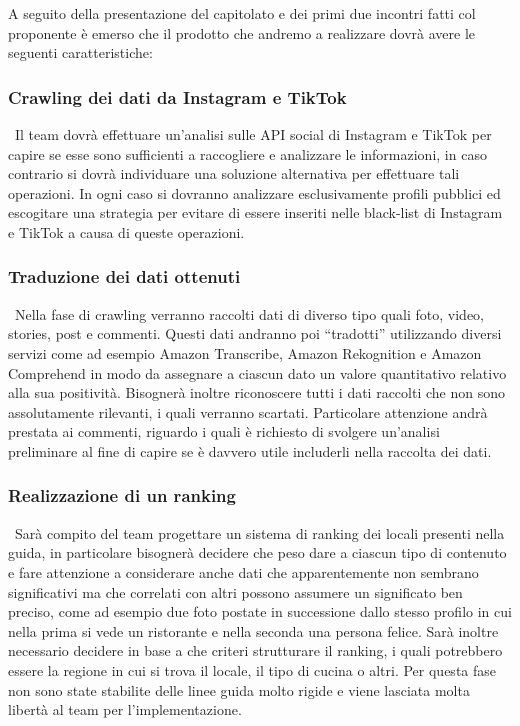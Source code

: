 \documentclass[letterpaper]{article}
\begin{document}
A seguito della presentazione del capitolato e dei primi due incontri fatti col proponente è emerso che il prodotto che andremo a realizzare dovrà avere le seguenti caratteristiche:

\subsubsection{Crawling dei dati da Instagram e TikTok} \ 
Il team dovrà effettuare un’analisi sulle API social di Instagram e TikTok per capire se esse sono sufficienti a raccogliere e analizzare le informazioni, in caso contrario si dovrà individuare una soluzione alternativa per effettuare tali operazioni. In ogni caso si dovranno analizzare esclusivamente profili pubblici ed escogitare una strategia per evitare di essere inseriti nelle black-list di Instagram e TikTok a causa di queste operazioni.

\subsubsection{Traduzione dei dati ottenuti} \
Nella fase di crawling verranno raccolti dati di diverso tipo quali foto, video, stories, post e commenti. Questi dati andranno poi “tradotti” utilizzando diversi servizi come ad esempio Amazon Transcribe, Amazon Rekognition e Amazon Comprehend in modo da assegnare a ciascun dato un valore quantitativo relativo alla sua positività. Bisognerà inoltre riconoscere tutti i dati raccolti che non sono assolutamente rilevanti, i quali verranno scartati. Particolare attenzione andrà prestata ai commenti, riguardo i quali è richiesto di svolgere un’analisi preliminare al fine di capire se è davvero utile includerli nella raccolta dei dati.

\subsubsection{Realizzazione di un ranking} \ 
Sarà compito del team progettare un sistema di ranking dei locali presenti nella guida, in particolare bisognerà decidere che peso dare a ciascun tipo di contenuto e fare attenzione a considerare anche dati che apparentemente non sembrano significativi ma che correlati con altri possono assumere un significato ben preciso, come ad esempio due foto postate in successione dallo stesso profilo in cui nella prima si vede un ristorante e nella seconda una persona felice. Sarà inoltre necessario decidere in base a che criteri strutturare il ranking, i quali potrebbero essere la regione in cui si trova il locale, il tipo di cucina o altri. Per questa fase non sono state stabilite delle linee guida molto rigide e viene lasciata molta libertà al team per l’implementazione.
\end{document}
